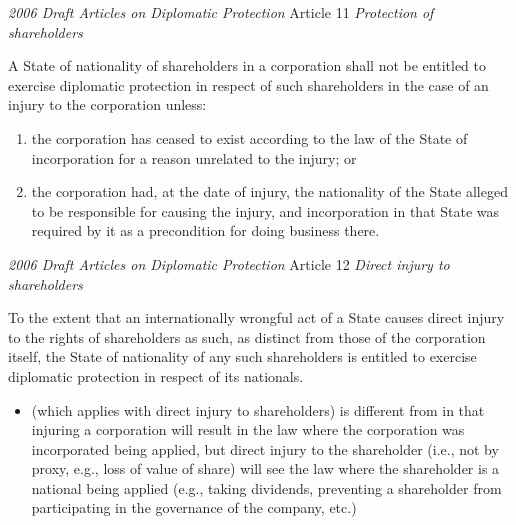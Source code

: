 \begin{conventiondetails}{\textit{2006 Draft Articles on Diplomatic Protection} Article 11}
    \flushleft
    \textit{Protection of shareholders}
    
    \vspace{\baselineskip}

    A State of nationality of shareholders in a corporation shall not be entitled to exercise diplomatic protection in respect of such shareholders in the case of an injury to the corporation unless: 
    \begin{enumerate}[label=(\alph*)]
        \item the corporation has ceased to exist according to the law of the State of incorporation for a reason unrelated to the injury; or 
        \item the corporation had, at the date of injury, the nationality of the State alleged to be responsible for causing the injury, and incorporation in that State was required by it as a precondition for doing business there. 
    \end{enumerate}
\end{conventiondetails}

\begin{conventiondetails}{\textit{2006 Draft Articles on Diplomatic Protection} Article 12}
    \flushleft
    \textit{Direct injury to shareholders}

    \vspace{\baselineskip}

    To the extent that an internationally wrongful act of a State causes direct injury to the rights of shareholders as such, as distinct from those of the corporation itself, the State of nationality of any such shareholders is entitled to exercise diplomatic protection in respect of its nationals.
\end{conventiondetails}

\begin{itemize}
    \item {} (which applies with direct injury to shareholders) is different from  in that injuring a corporation will result in the law where the corporation was incorporated being applied, but direct injury to the shareholder (i.e., not by proxy, e.g., loss of value of share) will see the law where the shareholder is a national being applied (e.g., taking dividends, preventing a shareholder from participating in the governance of the company, etc.)
\end{itemize}

